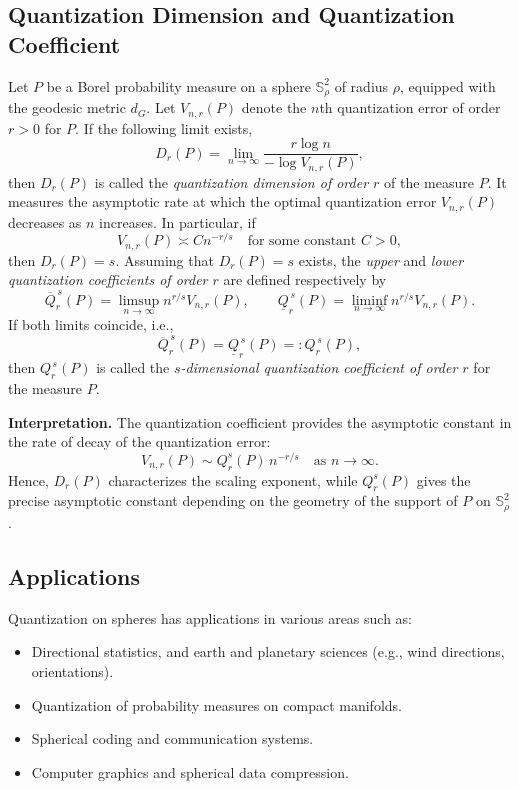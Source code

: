 \documentclass[12pt, reqno]{amsart}
\theoremstyle{plain}
\theoremstyle{definition}
\newcommand{\D}[1]{\mathbb{#1}}%
\newcommand{\nd}{\noindent}
\begin{document}
 

\subsection{Quantization Dimension and Quantization Coefficient}
Let $P$ be a Borel probability measure on a sphere $\D S_\rho^2$ of radius $\rho$, equipped with the geodesic metric $d_G$. 
Let $V_{n,r}(P)$ denote the $n$th quantization error of order $r>0$ for $P$. 
If the following limit exists,
\[
D_r(P)
    = \lim_{n \to \infty}
      \frac{r \log n}{-\log V_{n,r}(P)},
\]
then $D_r(P)$ is called the \emph{quantization dimension of order $r$} of the measure $P$. 
It measures the asymptotic rate at which the optimal quantization error $V_{n,r}(P)$ decreases as $n$ increases.
In particular, if
\[
V_{n,r}(P) \asymp C n^{-r/s}
\quad \text{for some constant } C>0,
\]
then $D_r(P) = s$.
Assuming that $D_r(P) = s$ exists, the \emph{upper} and \emph{lower quantization coefficients of order $r$} are defined respectively by
\[
\overline{Q}_{r}^{\,s}(P)
    = \limsup_{n \to \infty} n^{r/s} V_{n,r}(P),
\qquad
\underline{Q}_{r}^{\,s}(P)
    = \liminf_{n \to \infty} n^{r/s} V_{n,r}(P).
\]
If both limits coincide, i.e.,
\[
\overline{Q}_{r}^{\,s}(P)
    = \underline{Q}_{r}^{\,s}(P)
    =: Q_{r}^{\,s}(P),
\]
then $Q_{r}^{\,s}(P)$ is called the \emph{$s$-dimensional quantization coefficient of order $r$} for the measure $P$.
\medskip

\nd \textbf{Interpretation.}
The quantization coefficient provides the asymptotic constant in the rate of decay of the quantization error:
\[
V_{n,r}(P) \sim Q_r^s(P)\, n^{-r/s} \quad \text{as } n \to \infty.
\]
Hence, $D_r(P)$ characterizes the scaling exponent, while $Q_r^s(P)$ gives the precise asymptotic constant depending on the geometry of the support of $P$ on $\D S_\rho^2$. 
 
\subsection{Applications}

Quantization on spheres has applications in various areas such as:
\begin{itemize}
  \item Directional statistics,  and earth and planetary sciences (e.g., wind directions, orientations).
  \item Quantization of probability measures on compact manifolds.
  \item Spherical coding and communication systems.
  \item Computer graphics and spherical data compression.
\end{itemize}
\end{document}
